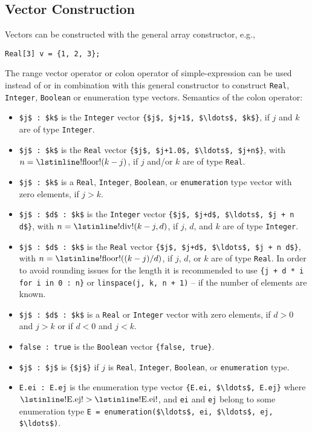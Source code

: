 \subsection{Vector Construction}\label{vector-construction}

Vectors can be constructed with the general array constructor, e.g.,
\begin{lstlisting}[language=modelica]
Real[3] v = {1, 2, 3};
\end{lstlisting}
The range vector operator or colon operator of simple-expression can be used instead of or in combination with this general constructor to construct \lstinline!Real!, \lstinline!Integer!, \lstinline!Boolean! or enumeration type vectors.  Semantics of the colon operator:
\begin{itemize}
\item
  \lstinline!$j$ : $k$! is the \lstinline!Integer! vector \lstinline!{$j$, $j+1$, $\ldots$, $k$}!, if $j$ and $k$ are of type
  \lstinline!Integer!.
\item
  \lstinline!$j$ : $k$! is the \lstinline!Real! vector \lstinline!{$j$, $j+1.0$, $\ldots$, $j+n$}!, with $n = \text{\lstinline!floor!}(k - j)$, if
  $j$ and/or $k$ are of type \lstinline!Real!.
\item
  \lstinline!$j$ : $k$! is a \lstinline!Real!, \lstinline!Integer!, \lstinline!Boolean!, or \lstinline!enumeration! type vector with zero elements, if $j > k$.
\item
  \lstinline!$j$ : $d$ : $k$! is the \lstinline!Integer! vector \lstinline!{$j$, $j+d$, $\ldots$, $j + n d$}!, with $n = \text{\lstinline!div!}(k - j, d)$, if $j$, $d$, and $k$ are of type \lstinline!Integer!.
\item
  \lstinline!$j$ : $d$ : $k$! is the \lstinline!Real! vector \lstinline!{$j$, $j+d$, $\ldots$, $j + n d$}!, with $n = \text{\lstinline!floor!}((k-j)/d)$,
  if $j$, $d$, or $k$ are of type \lstinline!Real!.  In order to avoid rounding issues for the length it is recommended to use \lstinline!{j + d * i for i in 0 : n}! or
  \lstinline!linspace(j, k, n + 1)! -- if the number of elements are known.
\item
  \lstinline!$j$ : $d$ : $k$! is a \lstinline!Real! or \lstinline!Integer! vector with zero elements, if $d > 0$ and $j > k$ or if $d < 0$ and $j < k$.
\item
  \lstinline!false : true! is the \lstinline!Boolean! vector \lstinline!{false, true}!.
\item
  \lstinline!$j$ : $j$! is \lstinline!{$j$}! if $j$ is \lstinline!Real!, \lstinline!Integer!, \lstinline!Boolean!, or \lstinline!enumeration! type.
\item
  \lstinline!E.ei : E.ej! is the enumeration type vector \lstinline!{E.ei, $\ldots$, E.ej}! where
  $\text{\lstinline!E.ej!} > \text{\lstinline!E.ei!}$, and \lstinline!ei! and \lstinline!ej! belong to some enumeration type
  \lstinline!E = enumeration($\ldots$, ei, $\ldots$, ej, $\ldots$)!.
\end{itemize}

